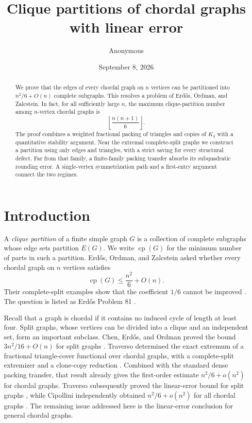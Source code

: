 \documentclass[11pt,reqno]{amsart}
\title[Linear-error clique partitions of chordal graphs]
  {Clique partitions of chordal graphs with linear error}
\author{Anonymous}
\date{September 8, 2026}
\numberwithin{equation}{section}
\theoremstyle{definition}
\theoremstyle{remark}
\newcommand{\cp}{\operatorname{cp}}
\begin{document}
\begin{abstract}
We prove that the edges of every chordal graph on $n$ vertices can be
partitioned into $n^2/6+O(n)$ complete subgraphs.  This resolves a problem of
Erd\H{o}s, Ordman, and Zalcstein.  In fact, for all sufficiently large $n$, the
maximum clique-partition number among $n$-vertex chordal graphs is
\[
  \left\lfloor\frac{n(n+1)}6\right\rfloor .
\]
The proof combines a weighted fractional packing of triangles and copies of
$K_4$ with a quantitative stability argument.  Near the extremal
complete-split graphs we construct a partition using only edges and triangles,
with a strict saving for every structural defect.  Far from that family, a
finite-family packing transfer absorbs its subquadratic rounding error.  A
single-vertex symmetrization path and a first-entry argument connect the two
regimes.
\end{abstract}

\maketitle

\section{Introduction}

A \emph{clique partition} of a finite simple graph $G$ is a collection of
complete subgraphs whose edge sets partition $E(G)$.  We write $\cp(G)$ for
the minimum number of parts in such a partition.  Erd\H{o}s, Ordman, and
Zalcstein asked whether every chordal graph on $n$ vertices satisfies
\begin{equation}\label{eq:erdos-question}
  \cp(G)\leq \frac{n^2}{6}+O(n).
\end{equation}
Their complete-split examples show that the coefficient $1/6$ cannot be
improved \cite{ErdosOrdmanZalcstein1993}.  The question is listed as Erd\H{o}s
Problem 81 \cite{ErdosProblems81}.

Recall that a graph is chordal if it contains no induced cycle of length at
least four.  Split graphs, whose vertices can be divided into a clique and an
independent set, form an important subclass.  Chen, Erd\H{o}s, and Ordman
proved the bound $3n^2/16+O(n)$ for split graphs
\cite{ChenErdosOrdman1994}.  Traverso determined the exact extremum of a
fractional triangle-cover functional over chordal graphs, with a
complete-split extremizer and a clone-copy reduction
\cite{TraversoPaperII2026}.  Combined with the standard dense packing
transfer, that result already gives the first-order estimate
$n^2/6+o(n^2)$ for chordal graphs.  Traverso subsequently proved the
linear-error bound for split graphs \cite{TraversoPaperIII2026}, while
Cipollini independently obtained $n^2/6+o(n^2)$ for all chordal graphs
\cite{Cipollini2026}.  The remaining issue addressed here is the linear-error
conclusion for general chordal graphs.
\end{document}
